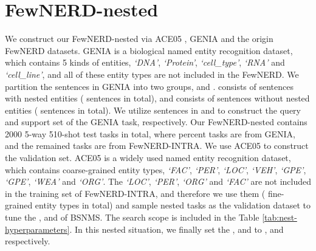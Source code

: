 \documentclass[11pt]{article}
\begin{document}
\section{FewNERD-nested}
\begin{table}[h]
    \centering
    \caption{The searching scope of BSNMS hyperparameters.}
    \label{tab:nest-hyperparameters}
\end{table}
\label{app:nest}
We construct our FewNERD-nested via ACE05 \cite{Ace05}, GENIA \cite{GENIA} and the origin FewNERD datasets.
GENIA is a biological named entity recognition dataset, which contains 5 kinds of entities, \textit{`DNA'}, \textit{`Protein'}, \textit{`cell\_type'}, \textit{`RNA'} and \textit{`cell\_line'}, and
all of these entity types are not included in the FewNERD.
We partition the sentences in GENIA into two groups,  and .
 consists of sentences with nested entities ( sentences in total), and  consists of sentences without nested entities ( sentences in total).
We utilize sentences in  and  to construct the query and support set of the GENIA task, respectively.
Our FewNERD-nested contains 2000 5-way 510-shot test tasks in total, where
 percent tasks are from GENIA, and the remained tasks are from FewNERD-INTRA.
We use ACE05 to construct the validation set.
ACE05 is a widely used named entity recognition dataset, which contains  coarse-grained entity types, \textit{`FAC'}, \textit{`PER'}, \textit{`LOC'}, \textit{`VEH'}, \textit{`GPE'}, \textit{`GPE'}, \textit{`WEA'} and \textit{`ORG'}.
The \textit{`LOC'}, \textit{`PER'}, \textit{`ORG'} and \textit{`FAC'} are not included in the training set of FewNERD-INTRA, and therefore we use them ( fine-grained entity types in total) and sample  nested tasks as the validation dataset to tune the ,  and  of BSNMS.
The search scope is included in the Table \ref{tab:nest-hyperparameters}.
In this nested situation, we finally set the ,  and  to ,  and  respectively.
\end{document}
